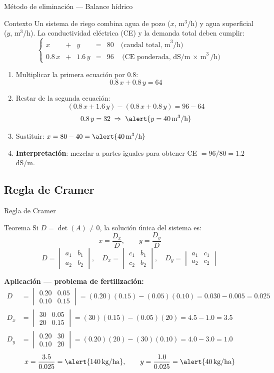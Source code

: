 \documentclass[11pt, aspectratio=169]{beamer}
\newcommand{\deter}[4]{\begin{vmatrix} #1 & #2 \\ #3 & #4 \end{vmatrix}}
\newcommand{\unidad}[1]{\,\text{#1}}
\begin{document}
\begin{frame}{Método de eliminación — Balance hídrico}
  \begin{exampleblock}{Contexto}
    Un sistema de riego combina agua de pozo ($x$, m$^3$/h)
    y agua superficial ($y$, m$^3$/h). La conductividad eléctrica (CE)
    y la demanda total deben cumplir:
    \[
      \left\{
      \begin{array}{rcrcr}
        x  & + &  y  & = & 80 \quad \text{(caudal total, m}^3\text{/h)} \\[4pt]
        0.8\,x & + & 1.6\,y & = & 96 \quad \text{(CE ponderada, dS/m $\times$ m}^3\text{/h)}
      \end{array}
      \right.
    \]
  \end{exampleblock}

  \begin{enumerate}
    \item<2-> Multiplicar la primera ecuación por $0.8$:
      \[ 0.8\,x + 0.8\,y = 64 \]

    \item<3-> Restar de la segunda ecuación:
      \[ (0.8\,x + 1.6\,y) - (0.8\,x + 0.8\,y) = 96 - 64 \]
      \[ 0.8\,y = 32 \;\Rightarrow\; \alert{y = 40 \unidad{m}^3\text{/h}} \]

    \item<4-> Sustituir: $x = 80 - 40 = \alert{40 \unidad{m}^3\text{/h}}$

    \item<5-> \textbf{Interpretación}: mezclar a partes iguales para obtener
      CE $= 96/80 = 1.2$ dS/m.
  \end{enumerate}
\end{frame}

\subsection{Regla de Cramer}

\begin{frame}{Regla de Cramer}
  \begin{block}{Teorema}
    Si $D = \det(A) \neq 0$, la solución única del sistema es:
    \[
      x = \frac{D_x}{D}, \qquad y = \frac{D_y}{D}
    \]
    \[
      D = \deter{a_1}{b_1}{a_2}{b_2}, \quad
      D_x = \deter{c_1}{b_1}{c_2}{b_2}, \quad
      D_y = \deter{a_1}{c_1}{a_2}{c_2}
    \]
  \end{block}

  \pause
  \textbf{Aplicación — problema de fertilización:}
  \begin{align*}
    D   &= \deter{0.20}{0.05}{0.10}{0.15}
         = (0.20)(0.15)-(0.05)(0.10) = 0.030 - 0.005 = 0.025 \\[4pt]
    D_x &= \deter{30}{0.05}{20}{0.15}
         = (30)(0.15)-(0.05)(20) = 4.5 - 1.0 = 3.5 \\[4pt]
    D_y &= \deter{0.20}{30}{0.10}{20}
         = (0.20)(20)-(30)(0.10) = 4.0 - 3.0 = 1.0
  \end{align*}
  \pause
  \[
    x = \frac{3.5}{0.025} = \alert{140 \unidad{kg/ha}}, \qquad
    y = \frac{1.0}{0.025} = \alert{40 \unidad{kg/ha}}
  \]
\end{frame}
\end{document}
